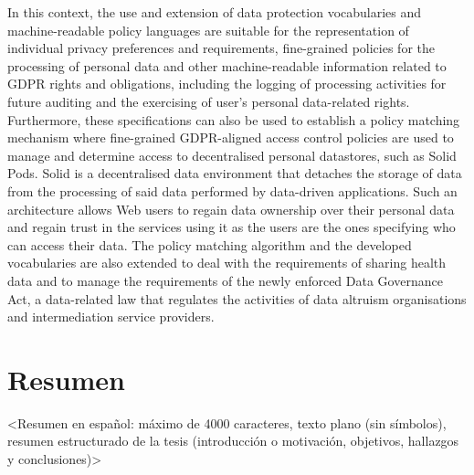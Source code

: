 In this context, the use and extension of data protection vocabularies and machine-readable policy languages are suitable for the representation of individual privacy preferences and requirements, fine-grained policies for the processing of personal data and other machine-readable information related to GDPR rights and obligations, including the logging of processing activities for future auditing and the exercising of user's personal data-related rights.
Furthermore, these specifications can also be used to establish a policy matching mechanism where fine-grained GDPR-aligned access control policies are used to manage and determine access to decentralised personal datastores, such as Solid Pods.
Solid is a decentralised data environment that detaches the storage of data from the processing of said data performed by data-driven applications.
Such an architecture allows Web users to regain data ownership over their personal data and regain trust in the services using it as the users are the ones specifying who can access their data.
The policy matching algorithm and the developed vocabularies are also extended to deal with the requirements of sharing health data and to manage the requirements of the newly enforced Data Governance Act, a data-related law that regulates the activities of data altruism organisations and intermediation service providers.


\newpage
\section*{Resumen}
\label{sec::resumen}


<Resumen en español: máximo de 4000 caracteres, texto plano (sin símbolos), resumen estructurado de la tesis (introducción o motivación, objetivos, hallazgos y conclusiones)>

